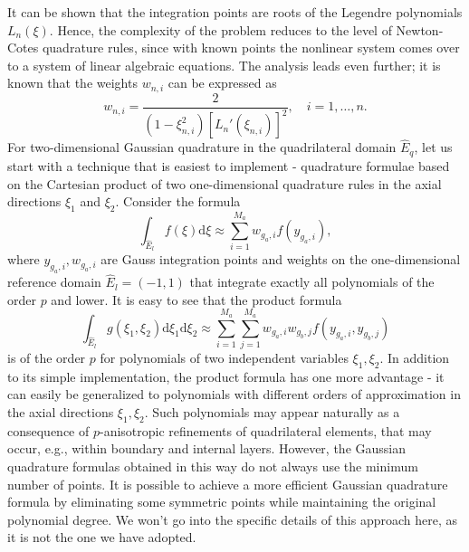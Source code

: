 \documentclass{develop-note}
\begin{document}
It can be shown that the integration points are roots of the Legendre polynomials $L_{n}(\xi)$. Hence, the complexity of the problem reduces to the level of Newton-Cotes quadrature rules, since with known points the nonlinear system comes over to a system of linear algebraic equations. The analysis leads even further; it is known that the weights $w_{n,i}$ can be expressed as
\begin{equation}
  w_{n,i}=\dfrac{2}{(1-\xi_{n,i}^{2})[L_{n}'(\xi_{n,i})]^{2}}, \quad i=1,\dots,n.
\end{equation}
For two-dimensional Gaussian quadrature in the quadrilateral domain $\hat{E}_{q}$, let us start with a technique that is easiest to implement - quadrature formulae based on the Cartesian product of two one-dimensional quadrature rules in the axial directions $\xi_{1}$ and $\xi_{2}$. Consider the formula
\begin{equation}
  \int_{\hat{E}_{l}}f(\xi)\mathrm{d}\xi\approx\sum_{i=1}^{M_{a}}w_{g_{a},i}f(y_{g_{a},i}),
\end{equation}
where $y_{g_{a},i},w_{g_{a},i}$ are Gauss integration points and weights on the one-dimensional reference domain $\hat{E}_{l}=(-1,1)$ that integrate exactly all polynomials of the order $p$ and lower. It is easy to see that the product formula
\begin{equation}
  \int_{\hat{E}_{l}}g(\xi_{1},\xi_{2})\mathrm{d}\xi_{1}\mathrm{d}\xi_{2}\approx\sum_{i=1}^{M_{a}}\sum_{j=1}^{M_{a}}w_{g_{a},i}w_{g_{b},j}f(y_{g_{a},i},y_{g_{b},j})
\end{equation}
is of the order $p$ for polynomials of two independent variables $\xi_{1},\xi_{2}$. In addition to its simple implementation, the product formula has one more advantage - it can easily be generalized to polynomials with different orders of approximation in the axial directions $\xi_{1},\xi_{2}$. Such polynomials may appear naturally as a consequence of $p$-anisotropic refinements of quadrilateral elements, that may occur, e.g., within boundary and internal layers. However, the Gaussian quadrature formulas obtained in this way do not always use the minimum number of points. It is possible to achieve a more efficient Gaussian quadrature formula by eliminating some symmetric points while maintaining the original polynomial degree. We won't go into the specific details of this approach here, as it is not the one we have adopted.
\end{document}
